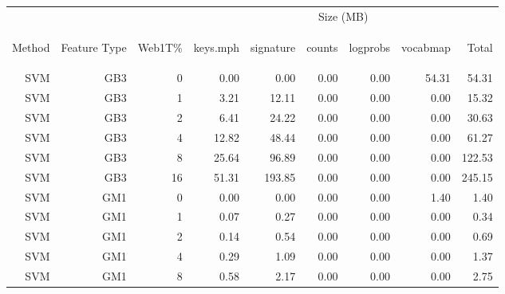 	\begin{table}[htbp!]
	\begin{center}
		\begin{tabular}{ | r | r | r | r | r | r | r | r | r | }
			\hline
			 &  &  & \multicolumn{6}{|c|}{Size (MB)}\\ \cline{4-9}
			\begin{sideways}Method\end{sideways} & \begin{sideways}Feature Type\end{sideways} & \begin{sideways}Web1T\%\end{sideways} & \begin{sideways}keys.mph\end{sideways} & \begin{sideways}signature\end{sideways} & \begin{sideways}counts\end{sideways} & \begin{sideways}logprobs\end{sideways} & \begin{sideways}vocabmap\end{sideways} & \begin{sideways}Total\end{sideways}\\ \hline 
			SVM & GB3 & 0 & 0.00 & 0.00 & 0.00 & 0.00 & 54.31 & 54.31\\ \hline 
			SVM & GB3 & 1 & 3.21 & 12.11 & 0.00 & 0.00 & 0.00 & 15.32\\ \hline 
			SVM & GB3 & 2 & 6.41 & 24.22 & 0.00 & 0.00 & 0.00 & 30.63\\ \hline 
			SVM & GB3 & 4 & 12.82 & 48.44 & 0.00 & 0.00 & 0.00 & 61.27\\ \hline 
			SVM & GB3 & 8 & 25.64 & 96.89 & 0.00 & 0.00 & 0.00 & 122.53\\ \hline 
			SVM & GB3 & 16 & 51.31 & 193.85 & 0.00 & 0.00 & 0.00 & 245.15\\ \hline 
			SVM & GM1 & 0 & 0.00 & 0.00 & 0.00 & 0.00 & 1.40 & 1.40\\ \hline 
			SVM & GM1 & 1 & 0.07 & 0.27 & 0.00 & 0.00 & 0.00 & 0.34\\ \hline 
			SVM & GM1 & 2 & 0.14 & 0.54 & 0.00 & 0.00 & 0.00 & 0.69\\ \hline 
			SVM & GM1 & 4 & 0.29 & 1.09 & 0.00 & 0.00 & 0.00 & 1.37\\ \hline 
			SVM & GM1 & 8 & 0.58 & 2.17 & 0.00 & 0.00 & 0.00 & 2.75\\ \hline 

\end{tabular}
\end{center}
\end{table}
